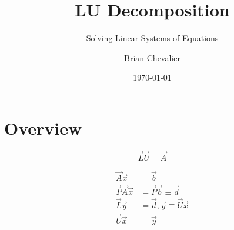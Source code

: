 \documentclass{../../KDHnotes}
\title{LU Decomposition}
\subtitle{Solving Linear Systems of Equations}
\author{Brian Chevalier}
\date{\today}
\begin{document}
 
\maketitle

\section{Overview}

\begin{equation}
	\vec{L} \vec{U} = \vec{A}
\end{equation}


\begin{align}
	\vec{A} \vec{x} &= \vec{b} \\
	\vec{P} \vec{A} \vec{x} &= \vec{P} \vec{b} \equiv \vec{d}\\
	\vec{L} \vec{y} &= \vec{d}, \vec{y} \equiv \vec{U} \vec{x}\\
	\vec{U} \vec{x} &= \vec{y}
\end{align}


\nocite{NumMethods}
\nocite{holisticnumericalmethods}

\newpage



\end{document}
